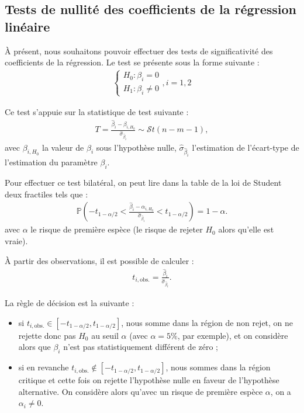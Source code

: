 \documentclass[
  11pt,
]{book}
\providecommand{\tightlist}{%
  \setlength{\itemsep}{0pt}\setlength{\parskip}{0pt}}
\numberwithin{equation}{section}
\numberwithin{countremarque}{section}
\begin{document}
\hypertarget{tests-de-nullituxe9-des-coefficients-de-la-ruxe9gression-linuxe9aire}{%
\subsection{Tests de nullité des coefficients de la régression linéaire}\label{tests-de-nullituxe9-des-coefficients-de-la-ruxe9gression-linuxe9aire}}

À présent, nous souhaitons pouvoir effectuer des tests de significativité des coefficients de la régression. Le test se présente sous la forme suivante :
\begin{align*}
\begin{cases}
H_0 : \beta_i = 0\\
H_1 : \beta_i \ne 0
\end{cases}, i = 1, 2
\end{align*}

Ce test s'appuie sur la statistique de test suivante :
\begin{align*}
T = \frac{\hat{\beta}_i - \beta_{i,H_0}}{\hat{\sigma}_{\hat{\beta}_i}} \sim \mathcal{S}t(n-m-1),
\end{align*}
avec \(\beta_{i,H_0}\) la valeur de \(\beta_i\) sous l'hypothèse nulle, \(\hat{\sigma}_{\hat{\beta}_i}\) l'estimation de l'écart-type de l'estimation du paramètre \(\beta_i\).

Pour effectuer ce test bilatéral, on peut lire dans la table de la loi de Student deux fractiles tels que :
\begin{align*}
\mathbb{P}\left( -t_{1-\alpha/2} < \frac{\hat{\beta}_i - \alpha_{i,H_0}}{\hat{\sigma}_{\hat{\beta}_i}} < t_{1-\alpha/2} \right) = 1 - \alpha.
\end{align*}
avec \(\alpha\) le risque de première espèce (le risque de rejeter \(H_0\) alors qu'elle est vraie).

À partir des observations, il est possible de calculer :
\begin{align*}
t_{i,\textrm{obs.}} = \frac{\hat{\beta}_i}{\hat{\sigma}_{\hat{\beta}_i}}.
\end{align*}

La règle de décision est la suivante :

\begin{itemize}
\tightlist
\item
  si \(t_{i,\textrm{obs.}} \in [-t_{1-\alpha/2}, t_{1-\alpha/2}]\), nous somme dans la région de non rejet, on ne rejette donc pas \(H_0\) au seuil \(\alpha\) (avec \(\alpha=5\%\), par exemple), et on considère alors que \(\beta_i\) n'est pas statistiquement différent de zéro ;
\item
  si en revanche \(t_{i,\textrm{obs.}} \notin [-t_{1-\alpha/2}, t_{1-\alpha/2}]\), nous sommes dans la région critique et cette fois on rejette l'hypothèse nulle en faveur de l'hypothèse alternative. On considère alors qu'avec un risque de première espèce \(\alpha\), on a \(\alpha_i \ne 0\).
\end{itemize}
\end{document}
